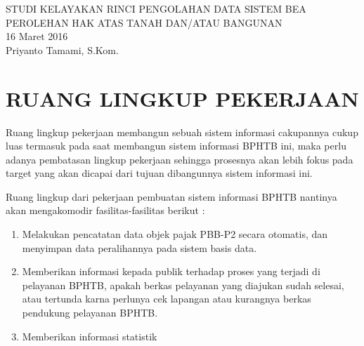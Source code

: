 \documentclass[pdftex,12pt, oneside]{article}
\begin{document}
\sloppy %

%
\begin{center}
{\large STUDI KELAYAKAN RINCI PENGOLAHAN DATA SISTEM BEA PEROLEHAN HAK ATAS TANAH DAN/ATAU BANGUNAN}
\\[1cm]
16 Maret 2016\\
Priyanto Tamami, S.Kom.
\end{center}


%
%

% 


%
%
%
%

%
%
%
% 
% 
% 

%
%


\section{RUANG LINGKUP PEKERJAAN}

Ruang lingkup pekerjaan membangun sebuah sistem informasi cakupannya cukup luas termasuk pada saat membangun sistem informasi BPHTB ini, maka perlu adanya pembatasan lingkup pekerjaan sehingga prosesnya akan lebih fokus pada target yang akan dicapai dari tujuan dibangunnya sistem informasi ini.

Ruang lingkup dari pekerjaan pembuatan sistem informasi BPHTB nantinya akan mengakomodir fasilitas-fasilitas berikut :

\begin{enumerate}[1.]
\item Melakukan pencatatan data objek pajak PBB-P2 secara otomatis, dan menyimpan data peralihannya pada sistem basis data.

\item Memberikan informasi kepada publik terhadap proses yang terjadi di pelayanan BPHTB, apakah berkas pelayanan yang diajukan sudah selesai, atau tertunda karna perlunya cek lapangan atau kurangnya berkas pendukung pelayanan BPHTB.

\item Memberikan informasi statistik
\end{enumerate}
\end{document}

